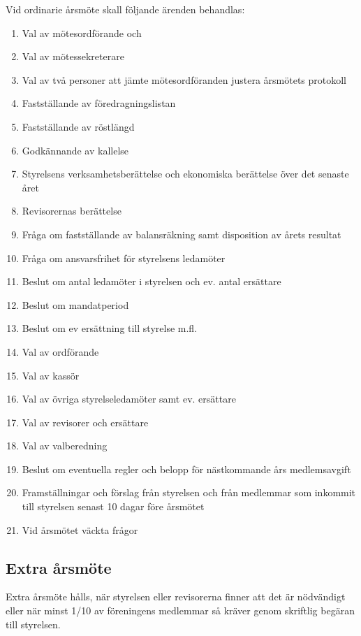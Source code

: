 \documentclass[11pt, a4paper]{article}
\begin{document}
Vid ordinarie årsmöte skall följande ärenden behandlas:

\begin{enumerate}
    \item Val av mötesordförande och 
    \item Val av mötessekreterare
    \item Val av två personer att jämte mötesordföranden justera årsmötets protokoll
    \item Fastställande av föredragningslistan
    \item Fastställande av röstlängd
    \item Godkännande av kallelse
    \item Styrelsens verksamhetsberättelse och ekonomiska berättelse över det senaste året
    \item Revisorernas berättelse
    \item Fråga om fastställande av balansräkning samt disposition av årets resultat
    \item Fråga om ansvarsfrihet för styrelsens ledamöter
    \item Beslut om antal ledamöter i styrelsen och ev. antal ersättare
    \item Beslut om mandatperiod
    \item Beslut om ev ersättning till styrelse m.fl.
    \item Val av ordförande
    \item Val av kassör
    \item Val av övriga styrelseledamöter samt ev. ersättare
    \item Val av revisorer och ersättare
    \item Val av valberedning
    \item Beslut om eventuella regler och belopp för nästkommande års medlemsavgift
    \item Framställningar och förslag från styrelsen och från medlemmar som inkommit till styrelsen senast 10 dagar före årsmötet
    \item Vid årsmötet väckta frågor
\end{enumerate}

\subsection{Extra årsmöte}
Extra årsmöte hålls, när styrelsen eller revisorerna finner att det är nödvändigt eller när minst 1/10 av föreningens medlemmar så kräver genom skriftlig begäran till styrelsen.
\end{document}
